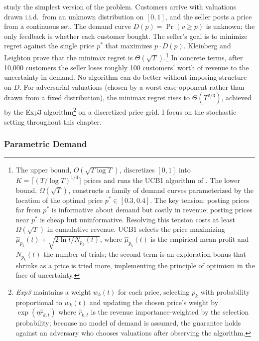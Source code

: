 \citet{Kleinberg2003} study the simplest version of the problem. Customers arrive with valuations drawn i.i.d.\ from an unknown distribution on $[0,1]$, and the seller posts a price from a continuous set. The demand curve $D(p) = \Pr(v \geq p)$ is unknown; the only feedback is whether each customer bought. The seller's goal is to minimize regret against the single price $p^*$ that maximizes $p \cdot D(p)$. Kleinberg and Leighton prove that the minimax regret is $\Theta(\sqrt{T})$.\footnote{The upper bound, $O(\sqrt{T \log T})$, discretizes $[0,1]$ into $K = \lceil (T/\log T)^{1/4} \rceil$ prices and runs the UCB1 algorithm of \citet{auer2002}. The lower bound, $\Omega(\sqrt{T})$, constructs a family of demand curves parameterized by the location of the optimal price $p^* \in [0.3, 0.4]$. The key tension: posting prices far from $p^*$ is informative about demand but costly in revenue; posting prices near $p^*$ is cheap but uninformative. Resolving this tension costs at least $\Omega(\sqrt{T})$ in cumulative revenue. UCB1 \citep{auer2002} selects the price maximizing $\hat{\mu}_{p_k}(t) + \sqrt{2\ln t / N_{p_k}(t)}$, where $\hat{\mu}_{p_k}(t)$ is the empirical mean profit and $N_{p_k}(t)$ the number of trials; the second term is an exploration bonus that shrinks as a price is tried more, implementing the principle of optimism in the face of uncertainty.} In concrete terms, after 10,000 customers the seller loses roughly 100 customers' worth of revenue to the uncertainty in demand. No algorithm can do better without imposing structure on $D$. For adversarial valuations (chosen by a worst-case opponent rather than drawn from a fixed distribution), the minimax regret rises to $\Theta(T^{2/3})$, achieved by the Exp3 algorithm\footnote{\emph{Exp3} \citep{auer2002nonstochastic} maintains a weight $w_k(t)$ for each price, selecting $p_k$ with probability proportional to $w_k(t)$ and updating the chosen price's weight by $\exp(\eta \hat{r}_{k,t})$ where $\hat{r}_{k,t}$ is the revenue importance-weighted by the selection probability; because no model of demand is assumed, the guarantee holds against an adversary who chooses valuations after observing the algorithm.} on a discretized price grid. I focus on the stochastic setting throughout this chapter.

\subsubsection{Parametric Demand}
\label{sec:broder}

